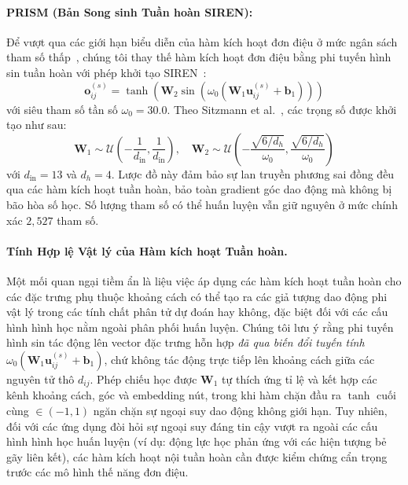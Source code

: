 \documentclass[10pt,twocolumn,letterpaper]{article}
\begin{document}
\paragraph{PRISM (Bản Song sinh Tuần hoàn SIREN):}
Để vượt qua các giới hạn biểu diễn của hàm kích hoạt đơn điệu ở mức ngân sách tham số thấp~\cite{rahaman2019spectral, sitzmann2020siren}, chúng tôi thay thế hàm kích hoạt đơn điệu bằng phi tuyến hình sin tuần hoàn với phép khởi tạo SIREN~\cite{sitzmann2020siren}:
\begin{equation}
    \mathbf{o}_{ij}^{(s)} = \tanh\left(\mathbf{W}_2 \sin\left(\omega_0 (\mathbf{W}_1 \mathbf{u}_{ij}^{(s)} + \mathbf{b}_1)\right)\right)
\end{equation}
với siêu tham số tần số $\omega_0 = 30.0$.
Theo Sitzmann et al.~\cite{sitzmann2020siren}, các trọng số được khởi tạo như sau:
\begin{equation}
    \mathbf{W}_1 \sim \mathcal{U}\left(-\frac{1}{d_{\mathrm{in}}}, \frac{1}{d_{\mathrm{in}}}\right), \quad \mathbf{W}_2 \sim \mathcal{U}\left(-\frac{\sqrt{6/d_h}}{\omega_0}, \frac{\sqrt{6/d_h}}{\omega_0}\right)
\end{equation}
với $d_{\mathrm{in}} = 13$ và $d_h = 4$.
Lược đồ này đảm bảo sự lan truyền phương sai đồng đều qua các hàm kích hoạt tuần hoàn, bảo toàn gradient góc dao động mà không bị bão hòa số học. Số lượng tham số có thể huấn luyện vẫn giữ nguyên ở mức chính xác $2{,}527$ tham số.

\paragraph{Tính Hợp lệ Vật lý của Hàm kích hoạt Tuần hoàn.}
Một mối quan ngại tiềm ẩn là liệu việc áp dụng các hàm kích hoạt tuần hoàn cho các đặc trưng phụ thuộc khoảng cách có thể tạo ra các giả tượng dao động phi vật lý trong các tính chất phân tử dự đoán hay không, đặc biệt đối với các cấu hình hình học nằm ngoài phân phối huấn luyện.
Chúng tôi lưu ý rằng phi tuyến hình sin tác động lên vector đặc trưng hỗn hợp \textit{đã qua biến đổi tuyến tính} $\omega_0(\mathbf{W}_1 \mathbf{u}_{ij}^{(s)} + \mathbf{b}_1)$, chứ không tác động trực tiếp lên khoảng cách giữa các nguyên tử thô $d_{ij}$.
Phép chiếu học được $\mathbf{W}_1$ tự thích ứng tỉ lệ và kết hợp các kênh khoảng cách, góc và embedding nút, trong khi hàm chặn đầu ra $\tanh$ cuối cùng $\in (-1, 1)$ ngăn chặn sự ngoại suy dao động không giới hạn.
Tuy nhiên, đối với các ứng dụng đòi hỏi sự ngoại suy đáng tin cậy vượt ra ngoài các cấu hình hình học huấn luyện (ví dụ: động lực học phản ứng với các hiện tượng bẻ gãy liên kết), các hàm kích hoạt nội tuần hoàn cần được kiểm chứng cẩn trọng trước các mô hình thế năng đơn điệu.
\end{document}

